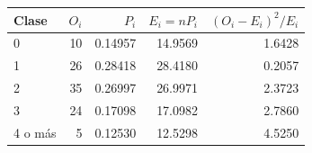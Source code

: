 \begin{tabular}{lrrrr}
\toprule
\textbf{Clase} & \textbf{$O_i$} & \textbf{$P_i$} & \textbf{$E_i=nP_i$} & \textbf{$(O_i-E_i)^2/E_i$} \\ \midrule
0 & 10 & 0.14957 & 14.9569 & 1.6428 \\
1 & 26 & 0.28418 & 28.4180 & 0.2057 \\
2 & 35 & 0.26997 & 26.9971 & 2.3723 \\
3 & 24 & 0.17098 & 17.0982 & 2.7860 \\
4 o más & 5 & 0.12530 & 12.5298 & 4.5250 \\
\bottomrule
\end{tabular}